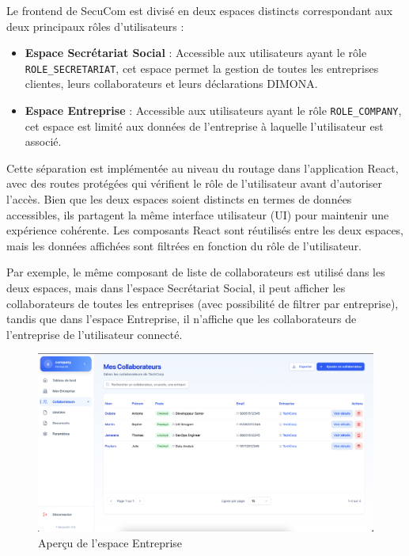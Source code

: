 \noindent Le frontend de SecuCom est divisé en deux espaces distincts correspondant aux deux principaux rôles d'utilisateurs :

\begin{itemize}[leftmargin=*,label=\textcolor{darkgray}{$\bullet$},itemsep=0.3em]
  \item \textbf{Espace Secrétariat Social} : Accessible aux utilisateurs ayant le rôle \texttt{ROLE\_SECRETARIAT}, cet espace permet la gestion de toutes les entreprises clientes, leurs collaborateurs et leurs déclarations DIMONA.
  \item \textbf{Espace Entreprise} : Accessible aux utilisateurs ayant le rôle \texttt{ROLE\_COMPANY}, cet espace est limité aux données de l'entreprise à laquelle l'utilisateur est associé.

\end{itemize}

\vspace{0.5cm}

Cette séparation est implémentée au niveau du routage dans l'application React, avec des routes protégées qui vérifient le rôle de l'utilisateur avant d'autoriser l'accès. Bien que les deux espaces soient distincts en termes de données accessibles, ils partagent la même interface utilisateur (UI) pour maintenir une expérience cohérente. Les composants React sont réutilisés entre les deux espaces, mais les données affichées sont filtrées en fonction du rôle de l'utilisateur.

\vspace{0.5cm}

\begin{note}
Par exemple, le même composant de liste de collaborateurs est utilisé dans les deux espaces, mais dans l'espace Secrétariat Social, il peut afficher les collaborateurs de toutes les entreprises (avec possibilité de filtrer par entreprise), tandis que dans l'espace Entreprise, il n'affiche que les collaborateurs de l'entreprise de l'utilisateur connecté.
\end{note}

\begin{figure}[H]
  \centering
  \includegraphics[width=1\textwidth]{SecuComPreviewCompanySpace.png}
  \caption{Aperçu de l'espace Entreprise}
  \label{fig:secucomPreviewUI}
\end{figure}

